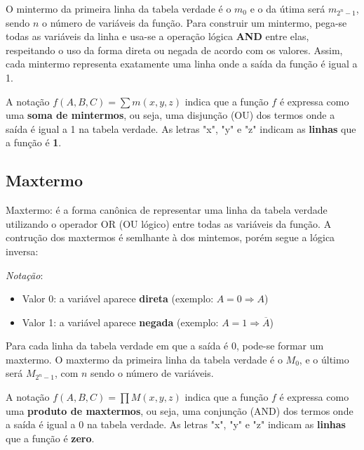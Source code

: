 \documentclass[12pt]{article}
\begin{document}
O mintermo da primeira linha da tabela verdade é o $m_0$ e o da útima será $m_{2^n - 1}$, sendo $n$ o número de variáveis da função.
Para construir um mintermo, pega-se todas as variáveis da linha e usa-se a operação lógica \textbf{AND} entre elas, respeitando o uso da forma direta ou negada de acordo com os valores. Assim, cada mintermo representa exatamente uma linha onde a saída da função é igual a 1.

\begin{tcolorbox}[mynote, title=Notação – Forma Canônica por Mintermos]
A notação \textit{$f(A, B, C) = \sum m(x, y, z)$} indica que a função $f$ é expressa como uma \textbf{soma de mintermos}, ou seja, uma disjunção (OU) dos termos onde a saída é igual a 1 na tabela verdade. As letras "x", "y" e "z" indicam as \textbf{linhas} que a função é \textbf{1}. 
\end{tcolorbox} 

\vspace{0.5cm}

\subsection{Maxtermo}
Maxtermo: é a forma canônica de representar uma linha da tabela verdade utilizando o operador OR (OU lógico) entre todas as variáveis da função. 
A contrução dos maxtermos é semlhante à dos mintemos, porém segue a lógica inversa:

\textit{Notação}:
\begin{itemize}
   \item Valor 0: a variável aparece \textbf{direta} (exemplo: $A = 0 \Rightarrow A$)
   \item Valor 1: a variável aparece \textbf{negada} (exemplo: $A = 1 \Rightarrow \overline{A}$)
\end{itemize}

Para cada linha da tabela verdade em que a saída é 0, pode-se formar um maxtermo. O maxtermo da primeira linha da tabela verdade é o $M_0$, e o último será $M_{2^n - 1}$, com $n$ sendo o número de variáveis.

\begin{tcolorbox}[mynote, title=Notação – Forma Canônica por Maxtermos]
A notação \textit{$f(A, B, C) = \prod M(x, y, z)$} indica que a função $f$ é expressa como uma \textbf{produto de maxtermos}, ou seja, uma conjunção (AND) dos termos onde a saída é igual a 0 na tabela verdade. As letras "x", "y" e "z" indicam as \textbf{linhas} que a função é \textbf{zero}.
\end{tcolorbox} 
\end{document}
